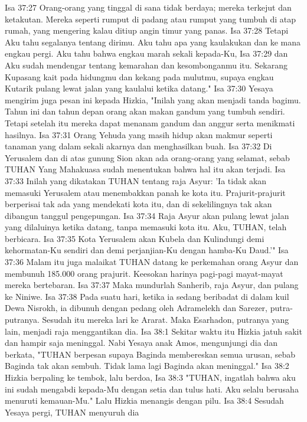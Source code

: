 Isa 37:27  Orang-orang yang tinggal di sana tidak berdaya; mereka terkejut dan ketakutan. Mereka seperti rumput di padang atau rumput yang tumbuh di atap rumah, yang mengering kalau ditiup angin timur yang panas.
Isa 37:28  Tetapi Aku tahu segalanya tentang dirimu. Aku tahu apa yang kaulakukan dan ke mana engkau pergi. Aku tahu bahwa engkau marah sekali kepada-Ku,
Isa 37:29  dan Aku sudah mendengar tentang kemarahan dan kesombonganmu itu. Sekarang Kupasang kait pada hidungmu dan kekang pada mulutmu, supaya engkau Kutarik pulang lewat jalan yang kaulalui ketika datang."
Isa 37:30  Yesaya mengirim juga pesan ini kepada Hizkia, "Inilah yang akan menjadi tanda bagimu. Tahun ini dan tahun depan orang akan makan gandum yang tumbuh sendiri. Tetapi setelah itu mereka dapat menanam gandum dan anggur serta menikmati hasilnya.
Isa 37:31  Orang Yehuda yang masih hidup akan makmur seperti tanaman yang dalam sekali akarnya dan menghasilkan buah.
Isa 37:32  Di Yerusalem dan di atas gunung Sion akan ada orang-orang yang selamat, sebab TUHAN Yang Mahakuasa sudah menentukan bahwa hal itu akan terjadi.
Isa 37:33  Inilah yang dikatakan TUHAN tentang raja Asyur: 'Ia tidak akan memasuki Yerusalem atau menembakkan panah ke kota itu. Prajurit-prajurit berperisai tak ada yang mendekati kota itu, dan di sekelilingnya tak akan dibangun tanggul pengepungan.
Isa 37:34  Raja Asyur akan pulang lewat jalan yang dilaluinya ketika datang, tanpa memasuki kota itu. Aku, TUHAN, telah berbicara.
Isa 37:35  Kota Yerusalem akan Kubela dan Kulindungi demi kehormatan-Ku sendiri dan demi perjanjian-Ku dengan hamba-Ku Daud.'"
Isa 37:36  Malam itu juga malaikat TUHAN datang ke perkemahan orang Asyur dan membunuh 185.000 orang prajurit. Keesokan harinya pagi-pagi mayat-mayat mereka bertebaran.
Isa 37:37  Maka mundurlah Sanherib, raja Asyur, dan pulang ke Niniwe.
Isa 37:38  Pada suatu hari, ketika ia sedang beribadat di dalam kuil Dewa Nisrokh, ia dibunuh dengan pedang oleh Adramelekh dan Sarezer, putra-putranya. Sesudah itu mereka lari ke Ararat. Maka Esarhadon, putranya yang lain, menjadi raja menggantikan dia.
Isa 38:1  Sekitar waktu itu Hizkia jatuh sakit dan hampir saja meninggal. Nabi Yesaya anak Amos, mengunjungi dia dan berkata, "TUHAN berpesan supaya Baginda membereskan semua urusan, sebab Baginda tak akan sembuh. Tidak lama lagi Baginda akan meninggal."
Isa 38:2  Hizkia berpaling ke tembok, lalu berdoa,
Isa 38:3  "TUHAN, ingatlah bahwa aku ini sudah mengabdi kepada-Mu dengan setia dan tulus hati. Aku selalu berusaha menuruti kemauan-Mu." Lalu Hizkia menangis dengan pilu.
Isa 38:4  Sesudah Yesaya pergi, TUHAN menyuruh dia
